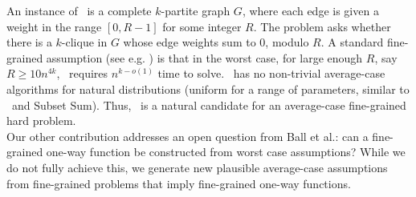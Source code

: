 An instance of \zkclique~is a complete $k$-partite graph $G$, where each edge is given a weight in the range $[0,R-1]$ for some integer $R$. The problem asks whether there is a $k$-clique in $G$ whose edge weights sum to $0$, modulo $R$. A standard fine-grained assumption (see e.g. \cite{icm-survey}) is that in the worst case, for large enough $R$, say $R\geq 10n^{4k}$, \zkclique~requires $n^{k-o(1)}$ time to solve. 
\zkclique~has no non-trivial average-case algorithms for natural distributions (uniform for a range of parameters, similar to \kSum~and Subset Sum). Thus, \zkclique~is a natural candidate for an average-case fine-grained hard problem.
\\






Our other contribution addresses an open question from Ball et al.: can a fine-grained one-way function be constructed from worst case assumptions? While we do not fully achieve this, we generate new plausible average-case assumptions from fine-grained problems that imply fine-grained one-way functions. %

